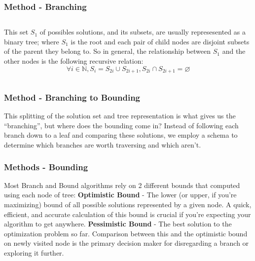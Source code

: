 \documentclass{beamer}
\begin{document}
\begin{frame}
\frametitle{Method - Branching}
\begin{columns}
    This set $S_1$ of possibles solutions, and its subsets, are usually represesented as a 
    binary tree; where $S_1$ is the root and each pair of child nodes are disjoint subsets of 
    the parent they belong to. So in general, the relationship between $S_1$ and the other nodes 
    is the following recursive relation:
    $$\forall i \in \mathbb{N}, S_i = S_{2i} \cup S_{2i+1},
    S_{2i} \cap S_{2i+1} = \varnothing$$

\end{columns}
\end{frame}


\begin{frame}
\frametitle{Method - Branching to Bounding}
This splitting of the solution set and tree representation is what 
gives us the ``branching'', but where does the bounding come in? \vfill
Instead of following each branch down to a leaf and comparing these solutions, we 
employ a schema to determine which branches are worth traversing and which aren't.
\end{frame}

\begin{frame}
\frametitle{Methods - Bounding}
Most Branch and Bound algorithms rely on 2 different bounds that computed using each node 
of tree:\vfill
\textbf{Optimistic Bound} - The lower (or upper, if you're maximizing) bound of all possible 
solutions represented by a given node. A quick, efficient, and accurate calculation of this 
bound is crucial if you're expecting your algorithm to get anywhere.\vfill
\textbf{Pessimistic Bound} - The best solution to the optimization problem so far. Comparison 
between this and the optimistic bound on newly visited node is the primary decision maker for
disregarding a branch or exploring it further. 
\end{frame}
\end{document}
